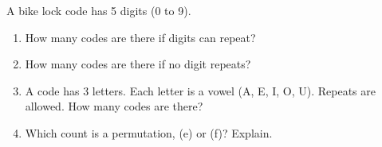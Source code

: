 \documentclass[11pt]{article}
\begin{document}
\begin{enumerate}[resume]
\begin{enumerate}
  \work{3em}
\end{enumerate}

\vspace{0.4em}
A bike lock code has 5 digits (0 to 9).
\begin{enumerate}[start=5]
  \item How many codes are there if digits can repeat? 
  \work{3em}
  \item How many codes are there if no digit repeats? 
  \work{3em}
  \item A code has 3 letters. Each letter is a vowel (A, E, I, O, U). Repeats are allowed. How many codes are there?

  \work{3em}
  \item Which count is a permutation, (e) or (f)? Explain.

  \work{3em}
\end{enumerate}

\end{enumerate}
\end{document}
